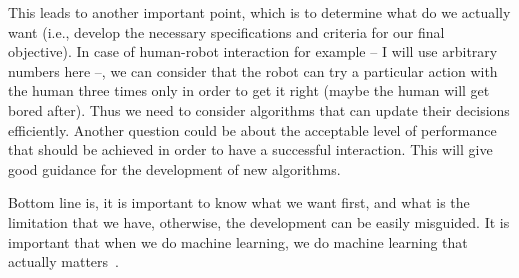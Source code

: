     \par This leads to another important point, which is to determine what do we actually want (i.e., develop the necessary specifications and criteria for our final objective). In case of human-robot interaction for example -- I will use arbitrary numbers here --, we can consider that the robot can try a particular action with the human three times only in order to get it right (maybe the human will get bored after). Thus we need to consider algorithms that can update their decisions efficiently. Another question could be about the acceptable level of performance that should be achieved in order to have a successful interaction. This will give good guidance for the development of new algorithms.

    \par Bottom line is, it is important to know what we want first, and what is the limitation that we have, otherwise, the development can be easily misguided. It is important that when we do machine learning, we do machine learning that actually matters~\citep{wagstaff2012machine}.

